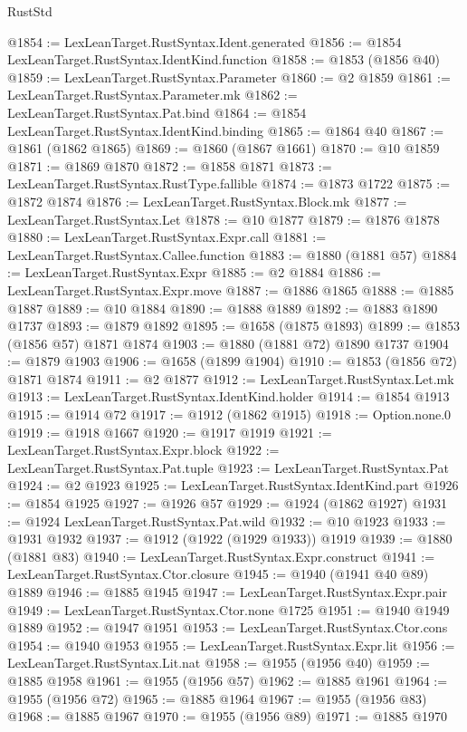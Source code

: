 \begin{lexlean}{RustStd}
\begin{coremodule}
@1854 := LexLeanTarget.RustSyntax.Ident.generated
@1856 := @1854 LexLeanTarget.RustSyntax.IdentKind.function
@1858 := @1853 (@1856 @40)
@1859 := LexLeanTarget.RustSyntax.Parameter
@1860 := @2 @1859
@1861 := LexLeanTarget.RustSyntax.Parameter.mk
@1862 := LexLeanTarget.RustSyntax.Pat.bind
@1864 := @1854 LexLeanTarget.RustSyntax.IdentKind.binding
@1865 := @1864 @40
@1867 := @1861 (@1862 @1865)
@1869 := @1860 (@1867 @1661)
@1870 := @10 @1859
@1871 := @1869 @1870
@1872 := @1858 @1871
@1873 := LexLeanTarget.RustSyntax.RustType.fallible
@1874 := @1873 @1722
@1875 := @1872 @1874
@1876 := LexLeanTarget.RustSyntax.Block.mk
@1877 := LexLeanTarget.RustSyntax.Let
@1878 := @10 @1877
@1879 := @1876 @1878
@1880 := LexLeanTarget.RustSyntax.Expr.call
@1881 := LexLeanTarget.RustSyntax.Callee.function
@1883 := @1880 (@1881 @57)
@1884 := LexLeanTarget.RustSyntax.Expr
@1885 := @2 @1884
@1886 := LexLeanTarget.RustSyntax.Expr.move
@1887 := @1886 @1865
@1888 := @1885 @1887
@1889 := @10 @1884
@1890 := @1888 @1889
@1892 := @1883 @1890 @1737
@1893 := @1879 @1892
@1895 := @1658 (@1875 @1893)
@1899 := @1853 (@1856 @57) @1871 @1874
@1903 := @1880 (@1881 @72) @1890 @1737
@1904 := @1879 @1903
@1906 := @1658 (@1899 @1904)
@1910 := @1853 (@1856 @72) @1871 @1874
@1911 := @2 @1877
@1912 := LexLeanTarget.RustSyntax.Let.mk
@1913 := LexLeanTarget.RustSyntax.IdentKind.holder
@1914 := @1854 @1913
@1915 := @1914 @72
@1917 := @1912 (@1862 @1915)
@1918 := Option.none.{0}
@1919 := @1918 @1667
@1920 := @1917 @1919
@1921 := LexLeanTarget.RustSyntax.Expr.block
@1922 := LexLeanTarget.RustSyntax.Pat.tuple
@1923 := LexLeanTarget.RustSyntax.Pat
@1924 := @2 @1923
@1925 := LexLeanTarget.RustSyntax.IdentKind.part
@1926 := @1854 @1925
@1927 := @1926 @57
@1929 := @1924 (@1862 @1927)
@1931 := @1924 LexLeanTarget.RustSyntax.Pat.wild
@1932 := @10 @1923
@1933 := @1931 @1932
@1937 := @1912 (@1922 (@1929 @1933)) @1919
@1939 := @1880 (@1881 @83)
@1940 := LexLeanTarget.RustSyntax.Expr.construct
@1941 := LexLeanTarget.RustSyntax.Ctor.closure
@1945 := @1940 (@1941 @40 @89) @1889
@1946 := @1885 @1945
@1947 := LexLeanTarget.RustSyntax.Expr.pair
@1949 := LexLeanTarget.RustSyntax.Ctor.none @1725
@1951 := @1940 @1949 @1889
@1952 := @1947 @1951
@1953 := LexLeanTarget.RustSyntax.Ctor.cons
@1954 := @1940 @1953
@1955 := LexLeanTarget.RustSyntax.Expr.lit
@1956 := LexLeanTarget.RustSyntax.Lit.nat
@1958 := @1955 (@1956 @40)
@1959 := @1885 @1958
@1961 := @1955 (@1956 @57)
@1962 := @1885 @1961
@1964 := @1955 (@1956 @72)
@1965 := @1885 @1964
@1967 := @1955 (@1956 @83)
@1968 := @1885 @1967
@1970 := @1955 (@1956 @89)
@1971 := @1885 @1970

\end{coremodule}
\end{lexlean}
